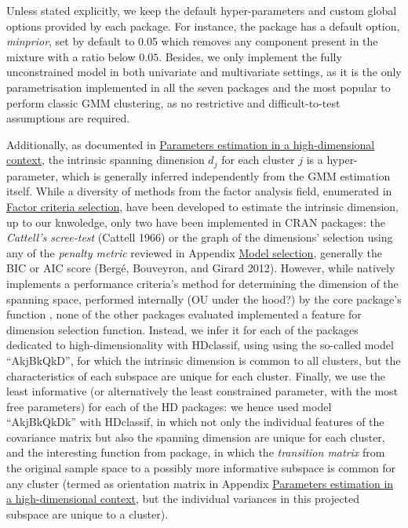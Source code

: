 Unless stated explicitly, we keep the default hyper-parameters and custom global options provided by each package. For instance, the  package has a default option, \emph{minprior}, set by default to 0.05 which removes any component present in the mixture with a ratio below \(0.05\). Besides, we only implement the fully unconstrained model in both univariate and multivariate settings, as it is the only parametrisation implemented in all the seven packages and the most popular to perform classic GMM clustering, as no restrictive and difficult-to-test assumptions are required.

\color{green} Additionally, as documented in \protect\hyperlink{parameters-estimation-in-a-high-dimensional-context}{Parameters estimation in a high-dimensional context}, the intrinsic spanning dimension \(d_j\) for each cluster \(j\) is a hyper-parameter, which is generally inferred independently from the GMM estimation itself. While a diversity of methods from the factor analysis field, enumerated in \href{https://en.wikipedia.org/wiki/Factor_analysis\#Criteria_for_determining_the_number_of_factors}{Factor criteria selection}, have been developed to estimate the intrinsic dimension, up to our knwoledge, only two have been implemented in CRAN packages: the \emph{Cattell's scree-test} (Cattell 1966) or the graph of the dimensions' selection using any of the \emph{penalty metric} reviewed in Appendix \protect\hyperlink{model-selection}{Model selection}, generally the BIC or AIC score (Bergé, Bouveyron, and Girard 2012). However, while  natively implements a performance criteria's method for determining the dimension of the spanning space, performed internally (OU under the hood?) by the core package's function , none of the other packages evaluated implemented a feature for dimension selection function. Instead, we infer it for each of the packages dedicated to high-dimensionality with HDclassif, using using the so-called model ``AkjBkQkD'', for which the intrinsic dimension is common to all clusters, but the characteristics of each subspace are unique for each cluster. Finally, we use the least informative (or alternatively the least constrained parameter, with the most free parameters) for each of the HD packages: we hence used model ``AkjBkQkDk'' with HDclassif, in which not only the individual features of the covariance matrix but also the spanning dimension are unique for each cluster, and the interesting function  from  package, in which the \emph{transition matrix} from the original sample space to a possibly more informative subspace is common for any cluster (termed as orientation matrix in Appendix \protect\hyperlink{parameters-estimation-in-a-high-dimensional-context}{Parameters estimation in a high-dimensional context}, but the individual variances in this projected subspace are unique to a cluster). \color{black}

